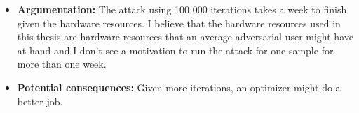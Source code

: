 \begin{itemize}
		\begin{itemize}
			\item \textbf{Argumentation:} The attack using 100 000 iterations takes a week to finish given the hardware resources. I believe that the hardware resources used in this thesis are hardware resources that an average adversarial user might have at hand and I don't see a motivation to run the attack for one sample for more than one week.
	
			\item \textbf{Potential consequences:} Given more iterations, an optimizer might do a better job.
		\end{itemize}
\end{itemize}







